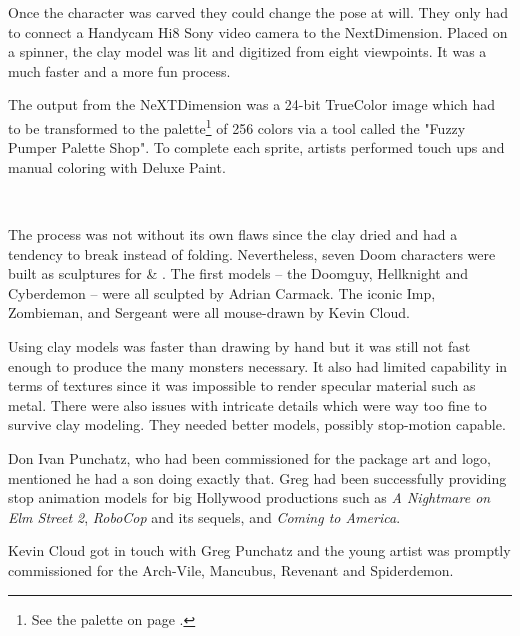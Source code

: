 \vspace{-4mm}
Once the character was carved they could change the pose at will. They only had to connect a Handycam Hi8 Sony video camera to the NextDimension. Placed on a spinner, the clay model was lit and digitized from eight viewpoints. It was a much faster and a more fun process.\par
\vspace{10pt}
The output from the NeXTDimension was a 24-bit TrueColor image which had to be transformed to the \doom{} palette\footnote{See the \doom{} palette on page \pageref{doom_palette}.} of 256 colors via a tool called the "Fuzzy Pumper Palette Shop". To complete each sprite, artists performed touch ups and manual coloring with Deluxe Paint.\\
\par
{}\\
\par
The process was not without its own flaws since the clay dried and had a tendency to break instead of folding. Nevertheless, seven Doom characters were built as sculptures for \doom{} \& \doomii{}. The first models -- the Doomguy, Hellknight and Cyberdemon -- were all sculpted by Adrian Carmack. The iconic Imp, Zombieman, and Sergeant were all mouse-drawn by Kevin Cloud.\\
\par
{}

\par





\vspace{-4mm}
Using clay models was faster than drawing by hand but it was still not fast enough to produce the many monsters necessary. It also had limited capability in terms of textures since it was impossible to render specular material such as metal. There were also issues with intricate details which were way too fine to survive clay modeling. They needed better models, possibly stop-motion capable.\\
\par
Don Ivan Punchatz, who had been commissioned for the \doom{} package art and logo, mentioned he had a son doing exactly that. Greg had been successfully providing stop animation models for big Hollywood productions such as \textit{A Nightmare on Elm Street 2}, \textit{RoboCop} and its sequels, and \textit{Coming to America}. \\
\par
Kevin Cloud got in touch with Greg Punchatz and the young artist was promptly commissioned for the Arch-Vile, Mancubus, Revenant and Spiderdemon.\\
\par

